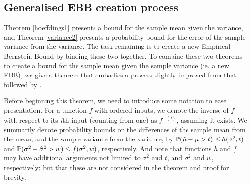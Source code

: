 \subsection{Generalised EBB creation process}\label{subsection:general_ebb_creation}

Theorem \ref{hoeffdings1} presents a bound for the sample mean given the variance, and Theorem \ref{variance2} presents a probability bound for the error of the sample variance from the variance. The task remaining is to create a new Empirical Bernstein Bound by binding these two together.
To combine these two theorems to create a bound for the sample mean given the sample variance (ie. a new EBB), we give a theorem that embodies a process slightly improved from that followed by \cite{Maurer50empiricalbernstein}.

Before beginning this theorem, we need to introduce some notation to ease presentation.
For a function $f$ with ordered inputs, we denote the inverse of $f$ with respect to its $i${th} input (counting from one) as $f^{-(i)}$, assuming it exists.
We summarily denote probability bounds on the differences of the sample mean from the mean, and the sample variance from the variance, by
$\operatorname{\mathbb{P}}(\hat{\mu}-\mu>t)\le h(\sigma^2,t)$ and $\operatorname{\mathbb{P}}(\sigma^2-\hat{\sigma}^2>w)\le f(\sigma^2,w)$, respectively.
And note that functions $h$ and $f$ may have additional arguments not limited to $\sigma^2$ and $t$, and $\sigma^2$ and $w$, respectively; but that these are not considered in the theorem and proof for brevity.

